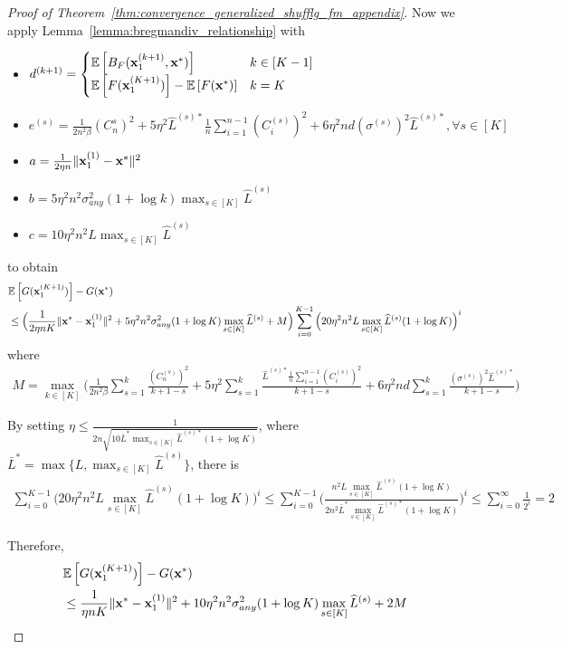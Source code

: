 \begin{proof}[Proof of Theorem~\ref{thm:convergence_generalized_shufflg_fm_appendix}]
    Now we apply Lemma~\ref{lemma:bregmandiv_relationship} with
    \begin{itemize}[itemsep=0mm]
        \item $d^{(k+1)}=\begin{cases}
                \mathbb{E}\left[ B_F({\mathbf{x}}_1^{(k+1)}, {\mathbf{x}}^*)\right] &k \in [K-1]\\
                \mathbb{E}\left[ F({\mathbf{x}}_1^{(K+1)})  \right] - \mathbb{E}\left[ F({\mathbf{x}}^*) \right]
                &k = K
            \end{cases}$
        \item $e^{(s)} = \frac{1}{2n^2 \beta}(C_n^{s})^2 + 5\eta^2 \widehat{L}^{(s)*}\frac{1}{n}\sum_{i=1}^{n-1}(C_i^{(s)})^2 + 6\eta^2 nd (\sigma^{(s)})^2 \widehat{L}^{(s)*}, \forall s\in [K]$
        \item $a = \frac{1}{2\eta n}\| {\mathbf{x}}_1^{(1)} - {\mathbf{x}}^*\|^2$
        \item $b = 5\eta^2 n^2 \sigma_{any}^2(1+\log k) \max_{s\in [K]} \widehat{L}^{(s)}$
        \item $c = 10\eta^2 n^2 L \max_{s\in[K]} \widehat{L}^{(s)}$
    \end{itemize}
    to obtain
    \begin{align}
        &\mathbb{E}\left[ G({\mathbf{x}}_1^{(K+1)}) \right] - G({\mathbf{x}}^*)\\
        \nonumber
        &\leq \Big( \frac{1}{2\eta n K} \|{\mathbf{x}}^* - {\mathbf{x}}_1^{(1)}\|^2
        + 5\eta^2 n^2 \sigma_{any}^2 (1+\log K)\max_{s\in[K]} \widehat{L}^{(s)} + M\Big)
        \sum_{i=0}^{K-1} \Big(20 \eta^2 n^2 L \max_{s\in [K]}\widehat{L}^{(s)}(1+\log K) \Big)^{i}
    \end{align}
    where 
    \begin{align*}
        M = \max_{k\in [K]} \Big(
        \frac{1}{2n^2 \beta}\sum_{s=1}^{k} \frac{ (C_n^{(s)})^2 }{k+1-s}
        + 5\eta^2 \sum_{s=1}^{k} \frac{ \widehat{L}^{(s)*} \frac{1}{n}\sum_{i=1}^{n-1}(C_i^{(s)})^2} {k+1-s}
        + 6\eta^2 nd \sum_{s=1}^{k} \frac{ (\sigma^{(s)})^2 \widehat{L}^{(s)*} }{k+1-s} \Big)
    \end{align*}

    By setting $\eta \leq \frac{1}{2n \sqrt{10 \bar{L}^{*} \max_{s\in [K]}\widehat{L}^{(s)*} (1+\log K)}}$, 
    where $\bar{L}^{*} = \max\{L, \max_{s\in[K]} \widehat{L}^{(s)}\}$,
    there is
    \begin{align}
        \sum_{i=0}^{K-1} \Big(20 \eta^2 n^2 L \max_{s\in [K]}\widehat{L}^{(s)}(1+\log K) \Big)^{i}
        \leq \sum_{i=0}^{K-1} \Big(
            \frac{n^2 L \max_{s\in[K]}\widehat{L}^{(s)} (1+\log K)}{2 n^2 \bar{L}^* \max_{s\in[K]} \widehat{L}^{(s)*} (1+\log K)}
        \Big)^{i}
        \leq \sum_{i=0}^{\infty} \frac{1}{2^{i}} = 2
    \end{align}

    Therefore,
    \begin{align}
        &\mathbb{E}\left[ G({\mathbf{x}}_1^{(K+1)}) \right] - G({\mathbf{x}}^*) \\
        \nonumber
        &\leq \frac{1}{\eta n K} \|{\mathbf{x}}^* - {\mathbf{x}}_1^{(1)}\|^2 
        + 10 \eta^2 n^2 \sigma_{any}^2 (1+\log K)\max_{s\in[K]} \widehat{L}^{(s)} + 2 M
    \end{align}
    
\end{proof}


